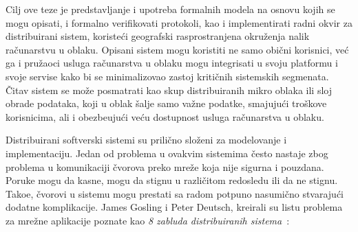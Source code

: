 Cilj ove teze je predstavljanje i upotreba formalnih modela na osnovu kojih se mogu opisati, i formalno verifikovati protokoli, kao i implementirati radni okvir za distribuirani sistem, koriste\'ci geografski rasprostranjena okru\v zenja nalik ra\v cunarstvu u oblaku. Opisani sistem mogu koristiti ne samo obi\v cni korisnici, ve\'c ga i pru\v zaoci usluga ra\v cunarstva u oblaku mogu integrisati u svoju platformu i svoje servise kako bi se minimalizovao zastoj kriti\v cnih sistemskih segmenata. \v Citav sistem se mo\v ze posmatrati kao skup distribuiranih mikro oblaka ili sloj obrade podataka, koji u oblak \v salje samo va\v zne podatke, smajuju\'ci tro\v skove korisnicima, ali i obezbe\dj uju\'ci ve\'cu dostupnost usluga ra\v cunarstva u oblaku.

Distribuirani softverski sistemi su prilično slo\v zeni za modelovanje i implementaciju. Jedan od problema u ovakvim sistemima \v cesto nastaje zbog problema u komunikaciji \v cvorova preko mre\v ze koja nije sigurna i pouzdana. Poruke mogu da kasne, mogu da stignu u razli\v citom redosledu ili da ne stignu. Tako\dj e, \v cvorovi u sistemu mogu prestati sa radom potpuno nasumi\v cno stvaraju\'ci dodatne komplikacije. James Gosling i Peter Deutsch, kreirali su listu problema za mre\v zne aplikacije poznate kao \textit{8 zabluda distribuiranih sistema}~\cite{articleRotem}:

